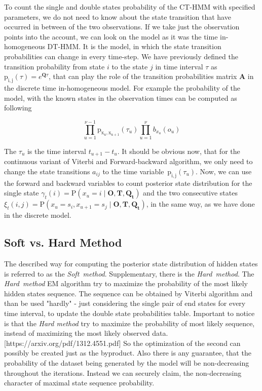 \documentclass[thesis=M,english]{FITthesis}[2012/10/20]
\newcommand{\matr}[1]{\mathbf{#1}}
\begin{document}
To count the single and double states probability of the CT-HMM with specified parameters, we do not need to know about the state transition that have occurred in between of the two observations.
If we take just the observation points into the account, we can look on the model as it was the time in-homogeneous DT-HMM. It is the model, in which the state transition probabilities can change in every time-step. We have previously defined the transition probability from state $i$ to the state $j$ in time interval $\tau$ as $\mathrm{p_{i,j}}( \tau ) = e^{ \matr{Q} \tau}$, that can play the role of the transition probabilities matrix $\matr{A}$ in the discrete time in-homogeneous model. For example the probability of the model, with the known states in the observation times can be computed as following

\begin{equation}
\prod_{u=1}^{\nu-1} \mathrm{p_{x_u, x_{u+1}}} (\tau_u) \prod_{u=1}^{\nu} b_{ x_u }(o_u)
\end{equation}

The $\tau_u$ is the time interval $t_{u+1} - t_u$. It should be obvious now, that for the continuous variant of Viterbi and Forward-backward algorithm, we only need to change the state transitions $a_{ij}$ to the time variable~$\mathrm{p_{i,j}}( \tau_u )$.   
Now, we can use the forward and backward variables to count posterior state distribution for the single state  $\gamma_t(i) = \mathrm{P}( x_u = i \mid \matr{O},\matr{T}, \matr{ Q_t } )$ and the two consecutive states $\xi_t(i,j) = \mathrm{P}( x_u = s_i, x_{u+1} = s_j \mid \matr{O},\matr{T}, \matr{ Q_t } )$, in the same way,  as we have done in the discrete model.

\subsection{Soft vs. Hard Method}\label{sec:shm}

The described way for computing the posterior state distribution of hidden states is referred to as the \textit{Soft~method}. Supplementary, there is the \textit{Hard~method}. The \textit{Hard~method} EM algorithm try to maximize the probability of the most likely hidden states sequence. The sequence can be obtained by Viterbi algorithm and than be used "hardly" - just considering the single pair of end states for every time interval, to update the double state probabilities table. Important to notice is that the \textit{Hard method} try to maximize the probability of most likely sequence, instead of maximizing the most likely observed data. [https://arxiv.org/pdf/1312.4551.pdf] So the optimization of the second can possibly be created just as the byproduct. Also there is any guarantee, that the probability of the dataset being generated by the model will be non-decreasing throughout the iterations. Instead we can securely claim, the non-decreasing character of maximal state sequence probability. 
\end{document}

